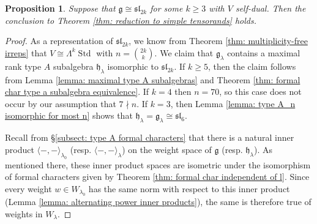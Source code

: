 \documentclass{amsart}
\newtheorem{proposition}[theorem]{Proposition}
\theoremstyle{definition}
\numberwithin{equation}{section} %
\newcommand{\sllie}{\mathfrak{sl}}
\newcommand{\Std}{\operatorname{Std}}
\newcommand{\mf}[1]{\mathfrak{#1}}
\begin{document}
\begin{proposition}\label{prop: sl_2k self-dual irred}
Suppose that $\mf{g} \cong \sllie_{2k}$ for some $k \geq 3$ with $V$ self-dual.
Then the conclusion to Theorem \ref{thm: reduction to simple tensorands} holds.
\end{proposition}
\begin{proof}
As a representation of $\sllie_{2k}$, we know from Theorem \ref{thm: multiplicity-free irreps} that $V \cong \Lambda^k \Std$ with $n = {{2k}\choose{k}}$.
We claim that $\mf{g}_\lambda$ contains a maximal rank type $A$ subalgebra $\mf{h}_\lambda$ isomorphic to $\sllie_{2k}$.
If $k \geq 5$, then the claim follows from Lemma \ref{lemma: maximal type A subalgebras} and Theorem \ref{thm: formal char type a subalgebra equivalence}.
If $k=4$ then $n = 70$, so this case does not occur by our assumption that $7 \nmid n$.
If $k=3$, then Lemma \ref{lemma: type A_n isomorphic for most n} shows that $\mf{h}_\lambda = \mf{g}_\lambda \cong \sllie_6$.

Recall from \S \ref{subsect: type A formal characters} that there is a natural inner product $\langle-,-\rangle_{\lambda_0}$ (resp. $\langle-,-\rangle_{\lambda}$) on the weight space of $\mf{g}$ (resp. $\mf{h}_\lambda$).
As mentioned there, these inner product spaces are isometric under the isomorphism of formal characters given by Theorem \ref{thm: formal char independent of l}.
Since every weight $w \in W_{\lambda_0}$ has the same norm with respect to this inner product (Lemma \ref{lemma: alternating power inner products}), the same is therefore true of weights in $W_\lambda$.


\end{proof}
\end{document}

